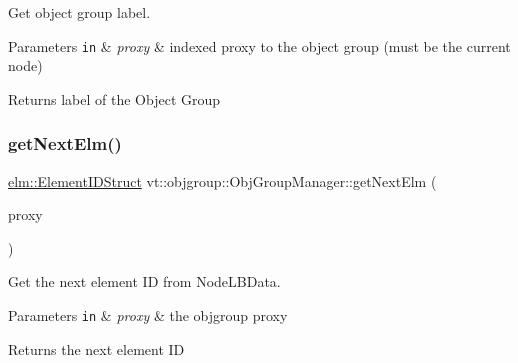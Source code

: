 Get object group label. 


\begin{DoxyParams}[1]{Parameters}
\mbox{\tt in}  & {\em proxy} & indexed proxy to the object group (must be the current node)\\
\hline
\end{DoxyParams}
\begin{DoxyReturn}{Returns}
label of the Object Group 
\end{DoxyReturn}
\mbox{\label{structvt_1_1objgroup_1_1_obj_group_manager_a0ebea4ad5b94becdeefe688d75f78142}} 
\subsubsection{\texorpdfstring{get\+Next\+Elm()}{getNextElm()}}
{\footnotesize\ttfamily \hyperlink{structvt_1_1elm_1_1_element_i_d_struct}{elm\+::\+Element\+I\+D\+Struct} vt\+::objgroup\+::\+Obj\+Group\+Manager\+::get\+Next\+Elm (\begin{DoxyParamCaption}\item[{\hyperlink{namespacevt_ad7cae989df485fccca57f0792a880a8e}{Obj\+Group\+Proxy\+Type}}]{proxy }\end{DoxyParamCaption})\hspace{0.3cm}{\ttfamily [private]}}



Get the next element ID from {\ttfamily Node\+L\+B\+Data}. 


\begin{DoxyParams}[1]{Parameters}
\mbox{\tt in}  & {\em proxy} & the objgroup proxy\\
\hline
\end{DoxyParams}
\begin{DoxyReturn}{Returns}
the next element ID 
\end{DoxyReturn}
\mbox{\label{structvt_1_1objgroup_1_1_obj_group_manager_a9758d68a4656e7ff2eb1ac07b4feeeed}} 
